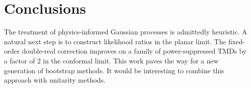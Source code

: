 \section{Conclusions}\label{sec:conclusions}

The treatment of physics-informed Gaussian processes is admittedly
heuristic. A natural next step is to construct likelihood ratios in the
planar limit. The fixed-order double-real correction improves on a
family of power-suppressed TMDs by a factor of 2 in the conformal limit.
This work paves the way for a new generation of bootstrap methods. It
would be interesting to combine this approach with unitarity methods.

